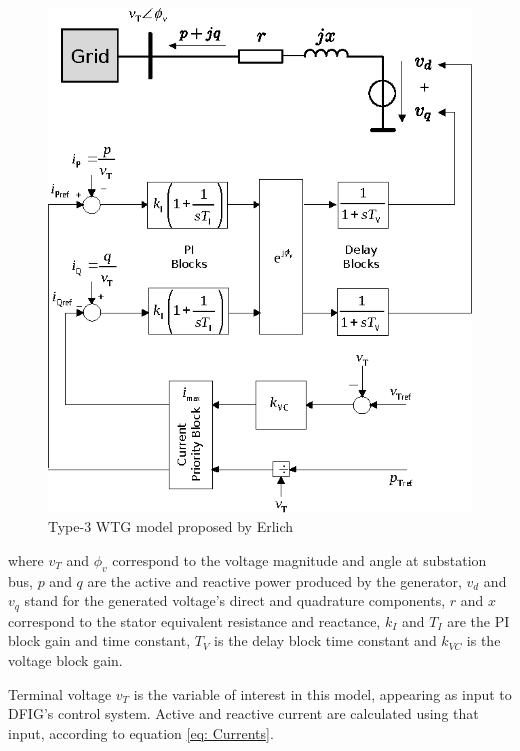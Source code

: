 \begin{figure}[h]
	\caption{Type-3 WTG model proposed by Erlich}
	\begin{center}
		\includegraphics[scale=1]{Images/ErlichModel.eps}
	\end{center}
	\label{fig: ErlMod}
\end{figure}

\noindent where $v_{T}$ and $\phi_{v}$ correspond to the voltage magnitude and angle at substation bus, $p$ and $q$ are the active and reactive power produced by the generator, $v_{d}$ and $v_{q}$ stand for the generated voltage's direct and quadrature components, $r$ and $x$ correspond to the stator equivalent resistance and reactance, $k_{I}$ and $T_{I}$ are the PI block gain and time constant, $T_{V}$ is the delay block time constant and $k_{VC}$ is the voltage block gain.

Terminal voltage $v_{T}$ is the variable of interest in this model, appearing as input to DFIG's control system. Active and reactive current are calculated using that input, according to equation \eqref{eq: Currents}.

